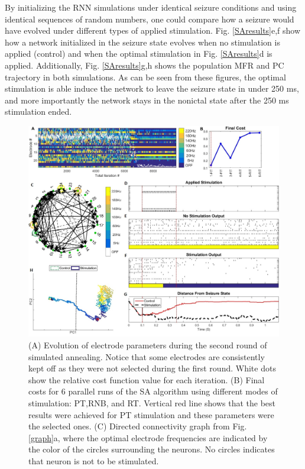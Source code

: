 \documentclass[journal,twoside,web]{ieeecolor}
\newcommand{\len}{250}   %
\begin{document}
By initializing the RNN simulations under identical seizure conditions and using identical sequences of random numbers, one could compare how a seizure would have evolved under different types of applied stimulation.
Fig. \ref{SAresults}e,f show how a network initialized in the seizure state evolves when no stimulation is applied (control) and when the optimal stimulation in Fig. \ref{SAresults}d is applied.
Additionally, Fig. \ref{SAresults}g,h shows the population MFR and PC trajectory in both simulations.
As can be seen from these figures, the optimal stimulation is able induce the network to leave the seizure state in under \len{} ms, and more importantly the network stays in the nonictal state after the \len{} ms stimulation ended.

\begin{figure}[!ht]
	\centering
	\includegraphics[width=160mm]{SAresults.jpg}
	\caption[Simulated Annealing Results]{
		(A) Evolution of electrode parameters during the second round of simulated annealing. Notice that some electrodes are consistently kept off as they were not selected during the first round. White dots show the relative cost function value for each iteration. 
		(B) Final costs for 6 parallel runs of the SA algorithm using different modes of stimulation: PT,RNB, and RT. Vertical red line shows that the best results were achieved for PT stimulation and these parameters were the selected ones.	
		(C) Directed connectivity graph from Fig. \ref{graph}a, where the optimal electrode frequencies are indicated by the color of the circles surrounding the neurons. No circles indicates that neuron is not to be stimulated.
}
\end{figure}
\end{document}
